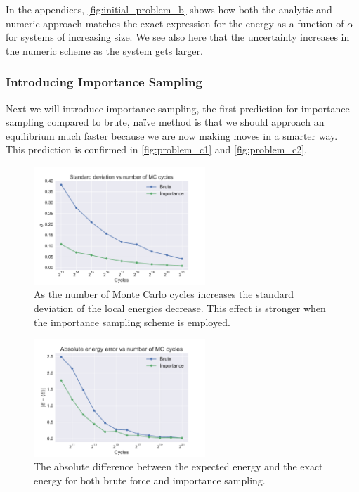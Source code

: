 \documentclass[
    a4paper, aps, twocolumn, floatfix, superscriptaddress, nofootinbib]{revtex4-1}
\newcommand{\1}{\mathds{1}}
\begin{document}
        In the appendices,  \autoref{fig:initial_problem_b} shows how both the
        analytic and numeric approach matches the exact expression for the
        energy as a function of $\alpha$ for systems of increasing size.  We see
        also here that the uncertainty increases in the numeric scheme as the
        system gets larger.

        \subsubsection{Introducing Importance Sampling}

            Next we will introduce importance sampling, the first prediction for
            importance sampling compared to brute, naïve method is that we
            should approach an equilibrium much faster because we are now making
            moves in a smarter way. This prediction is confirmed in
            \autoref{fig:problem_c1} and \autoref{fig:problem_c2}.

            \begin{figure}
                \centering
                    \includegraphics[width=244px]
                    {../data/figures/problem_c1.pdf}
                    \caption{As the number of Monte Carlo cycles increases the
                    standard deviation of the local energies decrease. This
                    effect is stronger when the importance sampling scheme is
                    employed.}
                    \label{fig:problem_c1}
            \end{figure}

            \begin{figure}
                \centering
                    \includegraphics[width=244px]
                    {../data/figures/problem_c2.pdf}
                    \caption{The absolute difference between the expected energy
                    and the exact energy for both brute force and importance
                    sampling. }
                    \label{fig:problem_c2}
            \end{figure}
\end{document}

